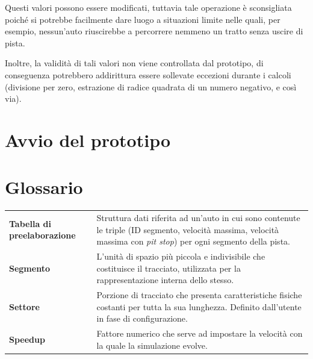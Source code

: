 \documentclass[11pt,a4paper]{report}
\newcommand{\term}[2]{\textbf{#1} & #2 \\}
\begin{document}
Questi valori possono essere modificati, tuttavia tale operazione è sconsigliata poiché si potrebbe facilmente dare luogo a situazioni limite nelle quali, per esempio, nessun'auto riuscirebbe a percorrere nemmeno un tratto senza uscire di pista.

Inoltre, la validità di tali valori non viene controllata dal prototipo, di conseguenza potrebbero addirittura essere sollevate eccezioni durante i calcoli (divisione per zero, estrazione di radice quadrata di un numero negativo, e così via).


\chapter{Avvio del prototipo}


\chapter{Glossario}

\begin{tabularx}{\textwidth}{lX}
\term{Tabella di preelaborazione}{Struttura dati riferita ad un'auto in cui sono contenute le triple (ID segmento, velocità massima, velocità massima con \textit{pit stop}) per ogni segmento della pista.}
\term{Segmento}{L'unità di spazio più piccola e indivisibile che costituisce il tracciato, utilizzata per la rappresentazione interna dello stesso.}
\term{Settore}{Porzione di tracciato che presenta caratteristiche fisiche costanti per tutta la sua lunghezza. Definito dall'utente in fase di configurazione.}
\term{Speedup}{Fattore numerico che serve ad impostare la velocità con la quale la simulazione evolve.}
\end{tabularx}
\end{document}
